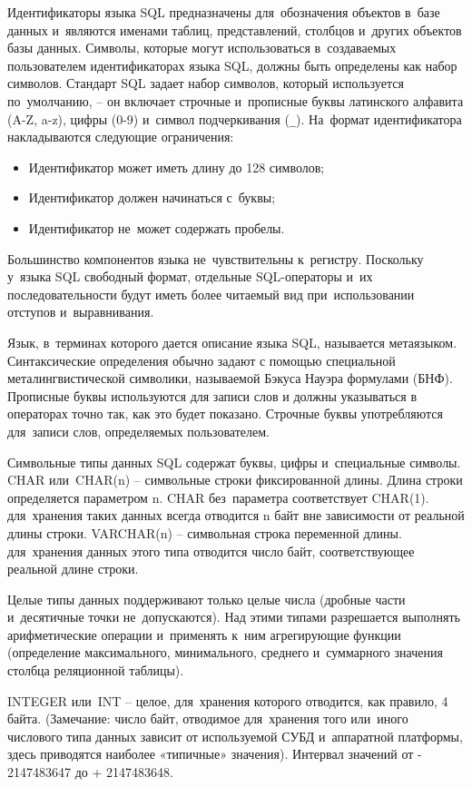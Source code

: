 \documentclass{ou}
\begin{document}
Идентификаторы языка SQL предназначены для~обозначения объектов в~базе данных и~являются именами таблиц, представлений, столбцов и~других объектов базы данных. Символы, которые могут использоваться в~создаваемых пользователем идентификаторах языка SQL, должны быть определены как набор символов. Стандарт SQL задает набор символов, который используется по~умолчанию, -- он включает строчные и~прописные буквы латинского алфавита (A-Z, a-z), цифры (0-9) и~символ подчеркивания (\verb+_+). На~формат идентификатора накладываются следующие ограничения: 
\begin{itemize}[label=-, leftmargin=0em, itemindent=3.35em, nosep]
\item Идентификатор может иметь длину до 128 символов;
\item Идентификатор должен начинаться с~буквы;
\item Идентификатор не~может содержать пробелы.
\end{itemize}

Большинство компонентов языка не~чувствительны к~регистру. Поскольку у~языка SQL свободный формат, отдельные SQL-операторы и~их последовательности будут иметь более читаемый вид при~использовании отступов и~выравнивания. 

Язык, в~терминах которого дается описание языка SQL, называется метаязыком. Синтаксические определения обычно задают с помощью специальной металингвистической символики, называемой Бэкуса Науэра формулами (БНФ). Прописные буквы используются для записи слов и должны указываться в операторах точно так, как это будет показано. Строчные буквы употребляются для~записи слов, определяемых пользователем.
 
Символьные типы данных SQL содержат буквы, цифры и~специальные символы. CHAR или~CHAR(n) -- символьные строки фиксированной длины. Длина строки определяется параметром n. CHAR без~параметра соответствует CHAR(1). для~хранения таких данных всегда отводится n байт вне зависимости от реальной длины строки. VARCHAR(n) -- символьная строка переменной длины. для~хранения данных этого типа отводится число байт, соответствующее реальной длине строки.

Целые типы данных поддерживают только целые числа (дробные части и~десятичные точки не~допускаются). Над этими типами разрешается выполнять арифметические операции и~применять к~ним агрегирующие функции (определение максимального, минимального, среднего и~суммарного значения столбца реляционной таблицы). 

INTEGER или~INT -- целое, для~хранения которого отводится, как правило, 4 байта. (Замечание: число байт, отводимое для~хранения того или~иного числового типа данных зависит от используемой СУБД и~аппаратной платформы, здесь приводятся наиболее «типичные» значения). Интервал значений от - 2147483647 до + 2147483648.
\end{document}
